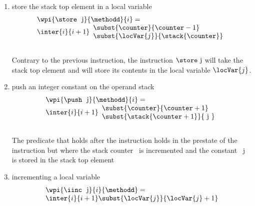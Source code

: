 \begin{itemize}
\begin{enumerate}
		\item store the stack top element in a local variable	 \\	 
		$$ \begin{array}{l}
                          \wpi{\store \ \mbox{ \rm j} } { \methodd}{i}  =   \\ 
		\inter{i}{i+1}\begin{array}{l} 
                                    \subst{\counter}{\counter   - 1} \\
				    \subst{\locVar{j} }{\stack{ \counter}}  
			       \end{array}
                   \end{array} $$ \\
		  
		  Contrary to the previous instruction, the instruction $\store \ \mbox{\rm j}$ will take the stack top element
		  and will store its contents in the local variable $\locVar{j}$.

		\item push an integer constant on the operand stack  \\
			$$\begin{array}{l}
                          \wpi{\push  \  \mbox{ \rm j} }  {\methodd} {i} =   \\
			  \inter{i}{i+1}\begin{array}{l}  
                                    \subst{\counter}{ \counter   + 1} \\ 
                                    \subst{\stack{ \counter +1 }}{ \mbox{ \rm j }}
			         \end{array}			
			\end{array} $$ \\
		   The predicate that holds after the instruction holds in the prestate of the instruction but where the stack counter \counter \
		   is incremented and the constant \mbox{ \rm j } is stored in the stack top element
	
		\item incrementing a local variable 
				$$ \begin{array}{l}
                                          \wpi{\iinc \   \mbox{ \rm j} } {i} {\methodd}   =  \\
				          \inter{i}{i+1} \subst{ \locVar{  j} }{  \locVar{j} + 1 } 
                                   \end{array}$$
		  
	\end{enumerate}
	

\end{itemize}
